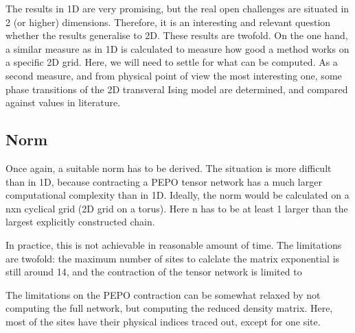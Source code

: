 The results in 1D are very promising, but the real open challenges are situated in 2 (or higher) dimensions. Therefore, it is an interesting and relevant question whether the results generalise to 2D. These results are twofold. On the one hand, a similar measure as in 1D is calculated to measure how good a method works on a specific 2D grid. Here, we will need to settle for what can be computed. As a second measure, and from physical point of view the most interesting one, some phase transitions of the 2D transveral Ising model are determined, and compared against values in literature.

\subsection{Norm}

Once again, a suitable norm has to be derived. The situation is more difficult than in 1D, because contracting a PEPO tensor network has a much larger computational complexity than in 1D. Ideally, the norm would be calculated on a nxn cyclical grid (2D grid on a torus). Here n has to be at least 1 larger than the largest explicitly constructed chain.

In practice, this is not achievable in reasonable amount of time. The limitations are twofold: the maximum number of sites to calclate the matrix exponential is still around 14, and the contraction of the tensor network is limited to 

The limitations on the PEPO contraction can be somewhat relaxed by not computing the full network, but computing the reduced density matrix. Here, most of the sites have their physical indices traced out, except for one site.

